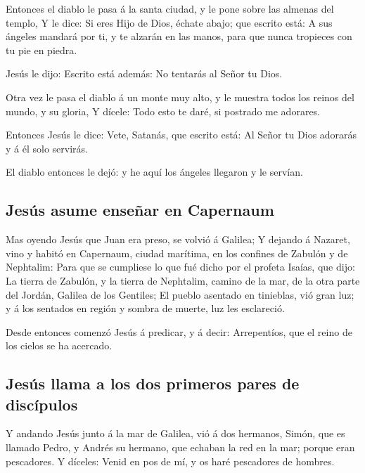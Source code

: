  Entonces el diablo le pasa á la santa ciudad, y le pone
sobre las almenas del templo,  Y le dice: Si eres Hijo de
Dios, échate abajo; que escrito está: A sus ángeles mandará por ti, y te
alzarán en las manos, para que nunca tropieces con tu pie en piedra.

 Jesús le dijo: Escrito está además: No tentarás al Señor tu
Dios.

 Otra vez le pasa el diablo á un monte muy alto, y le
muestra todos los reinos del mundo, y su gloria,  Y dícele:
Todo esto te daré, si postrado me adorares.

 Entonces Jesús le dice: Vete, Satanás, que escrito está:
Al Señor tu Dios adorarás y á él solo servirás.

 El diablo entonces le dejó: y he aquí los ángeles llegaron
y le servían.

\hypertarget{jesuxfas-asume-enseuxf1ar-en-capernaum}{%
\subsection{Jesús asume enseñar en
Capernaum}\label{jesuxfas-asume-enseuxf1ar-en-capernaum}}

 Mas oyendo Jesús que Juan era preso, se volvió á Galilea;
 Y dejando á Nazaret, vino y habitó en Capernaum, ciudad
marítima, en los confines de Zabulón y de Nephtalim:  Para
que se cumpliese lo que fué dicho por el profeta Isaías, que dijo:
 La tierra de Zabulón, y la tierra de Nephtalim, camino de
la mar, de la otra parte del Jordán, Galilea de los Gentiles;
 El pueblo asentado en tinieblas, vió gran luz; y á los
sentados en región y sombra de muerte, luz les esclareció.

 Desde entonces comenzó Jesús á predicar, y á decir:
Arrepentíos, que el reino de los cielos se ha acercado.

\hypertarget{jesuxfas-llama-a-los-dos-primeros-pares-de-discuxedpulos}{%
\subsection{Jesús llama a los dos primeros pares de
discípulos}\label{jesuxfas-llama-a-los-dos-primeros-pares-de-discuxedpulos}}

 Y andando Jesús junto á la mar de Galilea, vió á dos
hermanos, Simón, que es llamado Pedro, y Andrés su hermano, que echaban
la red en la mar; porque eran pescadores.  Y díceles: Venid
en pos de mí, y os haré pescadores de hombres.

